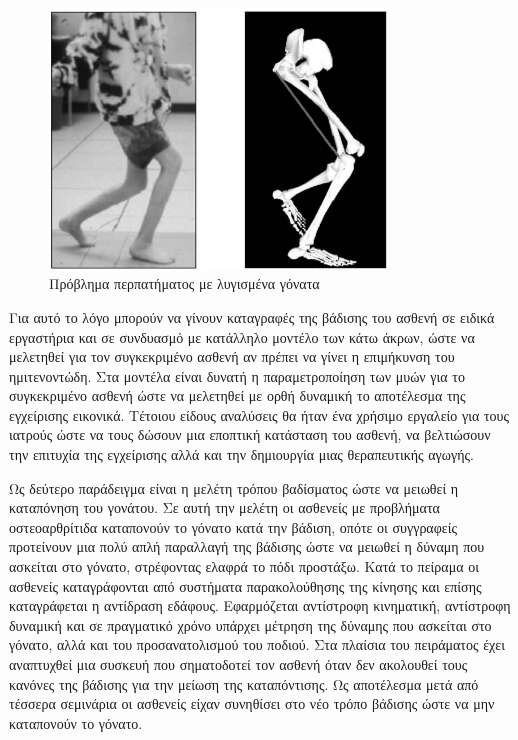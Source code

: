 \begin{figure}[H]
    \centering
    \includegraphics[width=0.8\textwidth, keepaspectratio]{fig/crouch-gait.png}
    \caption{Πρόβλημα περπατήματος με λυγισμένα γόνατα \cite{arnolda06}}
    \label{fig:crouch-gait}
\end{figure}

Για αυτό το λόγο μπορούν να γίνουν καταγραφές της βάδισης του ασθενή σε ειδικά εργαστήρια και σε συνδυασμό με κατάλληλο μοντέλο των κάτω άκρων, ώστε να μελετηθεί για τον συγκεκριμένο ασθενή αν πρέπει να γίνει η επιμήκυνση του ημιτενοντώδη. Στα μοντέλα είναι δυνατή η παραμετροποίηση των μυών για το συγκεκριμένο ασθενή ώστε να μελετηθεί με ορθή δυναμική το αποτέλεσμα της εγχείρισης εικονικά. Τέτοιου είδους αναλύσεις θα ήταν ένα χρήσιμο εργαλείο για τους ιατρούς ώστε να τους δώσουν μια εποπτική κατάσταση του ασθενή, να βελτιώσουν την επιτυχία της εγχείρισης αλλά και την δημιουργία μιας θεραπευτικής αγωγής.

Ως δεύτερο παράδειγμα \cite{fregly07} είναι η μελέτη τρόπου βαδίσματος ώστε να μειωθεί η καταπόνηση του γονάτου. Σε αυτή την μελέτη οι ασθενείς με προβλήματα οστεοαρθρίτιδα καταπονούν το γόνατο κατά την βάδιση, οπότε οι συγγραφείς προτείνουν μια πολύ απλή παραλλαγή της βάδισης ώστε να μειωθεί η δύναμη που ασκείται στο γόνατο, στρέφοντας ελαφρά το πόδι προστάξω. Κατά το πείραμα οι ασθενείς καταγράφονται από συστήματα παρακολούθησης της κίνησης και επίσης καταγράφεται η αντίδραση εδάφους. Εφαρμόζεται αντίστροφη κινηματική, αντίστροφη δυναμική και σε πραγματικό χρόνο υπάρχει μέτρηση της δύναμης που ασκείται στο γόνατο, αλλά και του προσανατολισμού του ποδιού. Στα πλαίσια του πειράματος έχει αναπτυχθεί μια συσκευή που σηματοδοτεί τον ασθενή όταν δεν ακολουθεί τους κανόνες της βάδισης για την μείωση της καταπόντισης. Ως αποτέλεσμα μετά από τέσσερα σεμινάρια οι ασθενείς είχαν συνηθίσει στο νέο τρόπο βάδισης ώστε να μην καταπονούν το γόνατο.


